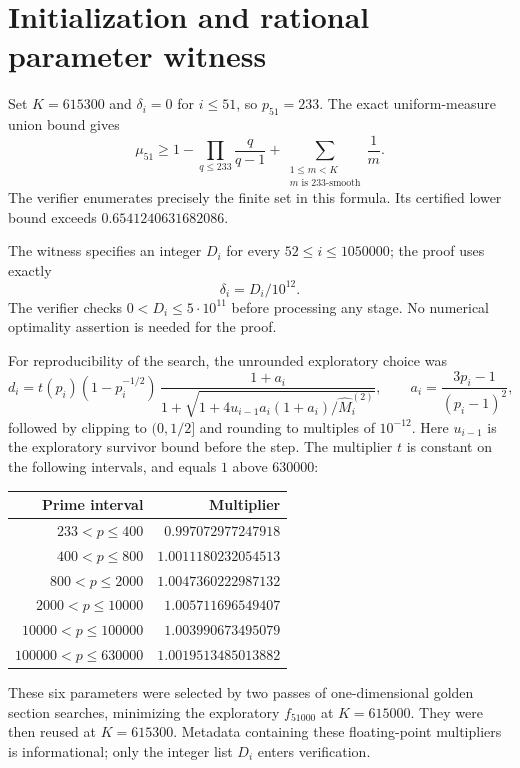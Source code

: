 \documentclass[11pt]{article}
\begin{document}
\section{Initialization and rational parameter witness}
Set $K=615300$ and $\delta_i=0$ for $i\leq51$, so $p_{51}=233$.
The exact uniform-measure union bound gives
\begin{equation}\label{eq:init}
 \mu_{51}\geq1-
 \prod_{q\leq233}\frac q{q-1}
 +\sum_{\substack{1\leq m<K\\m\text{ is }233\text{-smooth}}}\frac1m.
\end{equation}
The verifier enumerates precisely the finite set in this formula.
Its certified lower bound exceeds $0.6541240631682086$.

The witness specifies an integer $D_i$ for every $52\leq i\leq1050000$;
the proof uses exactly
\[
 \delta_i= D_i/10^{12}.
\]
The verifier checks $0<D_i\leq5\cdot10^{11}$ before processing any stage.
No numerical optimality assertion is needed for the proof.

For reproducibility of the search, the unrounded exploratory choice was
\[
 d_i=t(p_i)(1-p_i^{-1/2})\,
 \frac{1+a_i}{1+\sqrt{1+4u_{i-1}a_i(1+a_i)/\widehat M_i^{(2)}}},
 \qquad a_i=\frac{3p_i-1}{(p_i-1)^2},
\]
followed by clipping to $(0,1/2]$ and rounding to multiples of $10^{-12}$.
Here $u_{i-1}$ is the exploratory survivor bound before the step.
The multiplier $t$ is constant on the following intervals, and equals $1$
above $630000$:
\begin{center}
\begin{tabular}{rr}
\toprule
Prime interval & Multiplier \\
\midrule
$233<p\leq400$ & $0.997072977247918$\\
$400<p\leq800$ & $1.0011180232054513$\\
$800<p\leq2000$ & $1.0047360222987132$\\
$2000<p\leq10000$ & $1.005711696549407$\\
$10000<p\leq100000$ & $1.003990673495079$\\
$100000<p\leq630000$ & $1.0019513485013882$\\
\bottomrule
\end{tabular}
\end{center}
These six parameters were selected by two passes of one-dimensional golden
section searches, minimizing the exploratory $f_{51000}$ at $K=615000$.
They were then reused at $K=615300$. Metadata containing these floating-point
multipliers is informational; only the integer list $D_i$ enters verification.
\end{document}

